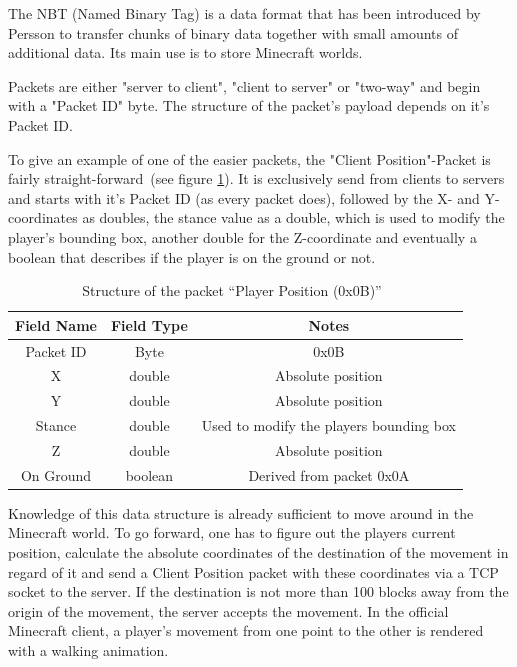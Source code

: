 The NBT (Named Binary Tag) is a data format that has been introduced by Persson to transfer chunks of binary data together with small amounts of additional data. Its main use is to store Minecraft worlds.

Packets are either "server to client", "client to server" or "two-way" and begin with a "Packet ID" byte. The structure of the packet's payload depends on it's Packet ID.
 
To give an example of one of the easier packets, the "Client Position"-Packet is fairly straight-forward~(see figure \ref{mc_packet}). It is exclusively send from clients to servers and starts with it's Packet ID (as every packet does), followed by the X- and Y-coordinates as doubles, the stance value as a double, which is used to modify the player's bounding box, another double for the Z-coordinate and eventually a boolean that describes if the player is on the ground or not.~\cite{protocol}

\begin{table}[htb]
\centering
\begin{tabular}{|c|c|c|}\hline

    Field Name & Field Type & Notes \\ \hline
   Packet ID & Byte & 0x0B \\ \hline
   X & double & Absolute position \\ \hline
   Y & double & Absolute position \\ \hline
   Stance & double & Used to modify the players bounding box \\ \hline
   Z & double & Absolute position \\ \hline
   On Ground & boolean & Derived from packet 0x0A \\ \hline
   
\end{tabular}
\caption{Structure of the packet ``Player Position (0x0B)''~\cite{protocol}}
\label{mc_packet}
\end{table}

Knowledge of this data structure is already sufficient to move around in the Minecraft world. To go forward, one has to figure out the players current position, calculate the absolute coordinates of the destination of the movement in regard of it and send a Client Position packet with these coordinates via a TCP socket to the server. If the destination is not more than 100 blocks away from the origin of the movement, the server accepts the movement. In the official Minecraft client, a player's movement from one point to the other is rendered with a walking animation.


